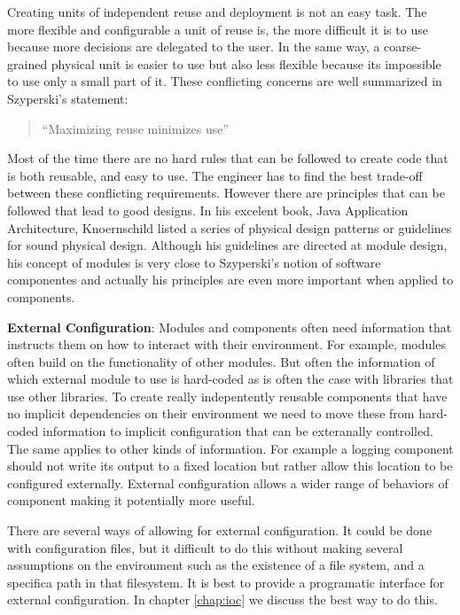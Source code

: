Creating units of independent reuse and deployment is not an easy task. The more flexible and
configurable a unit of reuse is, the more difficult it is to use because more decisions are
delegated to the user. In the same way, a coarse-grained physical unit is easier to use
but also less flexible because its impossible to  use only a small part of it. These 
conflicting concerns are well summarized in Szyperski's statement:

\begin{quotation}
``Maximizing reuse minimizes use'' 
\end{quotation}

Most of the time there are no hard rules that can be followed to create code that is both reusable,
and easy to use. The engineer has to find the best trade-off between these conflicting requirements.
However there are principles that can be followed that lead to good designs.
In his excelent book, Java Application Architecture, Knoernschild listed a series of physical
design patterns or guidelines for sound physical design. Although his guidelines are directed
at module design, his concept of modules is very close to Szyperski's notion of software componentes
and actually his principles are even more important when applied to components.

\textbf{External Configuration}:
Modules and components often need information that instructs them
on how to interact with their environment. For example, modules often build on the functionality
of other modules. But often the information of which external module to use is hard-coded as
is often the case with libraries that use other libraries. To create really indepentently reusable
components that have no implicit dependencies on their environment we need to move these
from hard-coded information to implicit configuration that can be exteranally controlled.
The same applies to other kinds of information. For example a logging component should not
write its output to a fixed location but rather allow this location to be configured externally.
External configuration allows a wider range of behaviors of component making it potentially
more useful.

There are several ways of allowing for external configuration. It could be done with configuration
files, but it difficult to do this without making several assumptions on the environment such as
the existence of a file system, and a specifica path in that filesystem. It is best to provide a
programatic interface for external configuration. In chapter \ref{chap:ioc} we discuss the best
way to do this.

